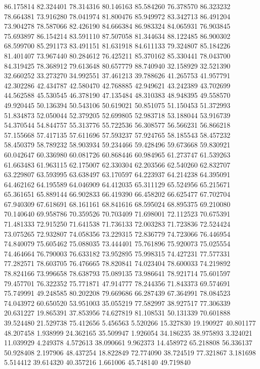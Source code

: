86.175814
82.324401
78.314316
80.146163
85.584260
76.378570
86.323232
78.664381
73.916280
78.041974
81.800476
85.949972
83.342713
86.491204
73.904278
78.587066
82.426190
84.666384
86.983324
84.065931
76.903845
75.693897
86.154214
83.591110
87.507058
81.344634
88.122485
86.900302
68.599700
85.291173
83.491151
81.631918
84.611133
79.324807
85.184226
81.401407
73.967440
80.284612
76.425211
85.370162
85.330441
78.043700
84.319425
78.368912
79.613648
80.657779
88.740940
32.158929
32.521390
32.660252
33.273270
34.992551
37.461213
39.788626
41.265753
41.957791
42.302286
42.434787
42.580470
42.768885
42.949621
43.242389
43.702699
44.562588
45.530545
46.378190
47.135484
48.310383
48.948395
49.558570
49.920445
50.136394
50.543106
50.619021
50.851075
51.150453
51.372993
51.834873
52.050044
52.379205
52.699805
52.983718
53.188044
53.916739
54.370544
54.844757
55.313776
55.722536
56.308577
56.566231
56.866218
57.155668
57.417135
57.611696
57.593237
57.924765
58.185543
58.457232
58.450379
58.789232
58.903934
59.234466
59.428496
59.673668
59.830921
60.042647
60.336980
60.081726
60.868446
60.984965
61.273747
61.539263
61.663483
61.963115
62.175007
62.330304
62.203566
62.540260
62.832707
63.229807
63.593995
63.638497
63.170597
64.223937
64.214238
64.395091
64.462162
64.195589
64.046909
64.412035
65.311129
65.524956
65.215671
65.361651
65.889144
66.902833
66.419390
66.458202
66.625477
67.702704
67.940309
67.618691
68.161161
68.841616
68.595024
68.895375
69.210080
70.140640
69.958786
70.359526
70.703409
71.698001
72.112523
70.675391
71.481333
72.915250
71.641538
71.736133
72.003283
71.723836
72.524424
73.075265
72.932807
74.058356
73.229315
72.836779
74.723066
76.446954
74.840079
75.605462
75.088035
73.444401
75.761896
75.920073
75.025554
74.464664
76.790003
76.633182
73.952895
75.998315
74.427231
77.577331
77.282571
78.603705
76.476665
78.820841
74.023404
78.600033
74.219892
78.824166
73.996658
78.638793
75.089135
73.986641
78.921714
75.601597
79.457701
76.322352
75.771871
47.914777
78.244356
71.843373
69.574691
75.749991
49.248585
80.202208
79.669686
66.287439
67.364991
78.084523
74.043972
60.650520
53.951003
35.055219
77.582997
38.927517
77.306339
20.631227
19.865391
37.853956
74.627819
81.108531
50.131339
70.601888
39.524480
21.529738
75.412656
5.456563
5.520266
15.327830
19.190927
40.801177
48.207458
1.938999
24.362165
35.509947
1.926054
34.186235
38.975893
3.324021
11.039929
4.249378
4.572613
38.090661
9.962373
14.458972
65.218808
56.336137
50.928408
2.197906
48.437254
18.822849
72.774090
38.724519
77.321867
3.181698
5.514412
39.614320
40.357216
1.661006
45.748140
49.719840

